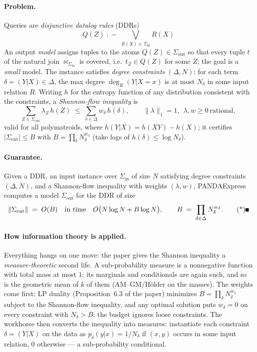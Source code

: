 \paragraph{Problem.}
Queries are \emph{disjunctive datalog rules} (DDRs)
\[
Q(Z) \;:\!-\; \bigvee_{R(X) \in \Sigma_{\mathrm{in}}} R(X)
\]
An output \emph{model} assigns tuples to the atoms
$Q(Z) \in \Sigma_{\mathrm{out}}$ so that every tuple $t$ of the natural join
$\Join_{\Sigma_{\mathrm{in}}}$ is covered, i.e.\ $t_Z \in Q(Z)$ for some $Z$; the goal
is a \emph{small} model. The instance satisfies \emph{degree constraints}
$(\Delta, N)$: for each term $\delta = (Y|X) \in \Delta$, the max degree
$\deg_R(Y|X{=}x)$ is at most $N_\delta$ in some input relation $R$. Writing $h$ for
the entropy function of any distribution consistent with the constraints, a
\emph{Shannon-flow inequality} is
\[
\sum_{Z \in \Sigma_{\mathrm{out}}} \lambda_Z\, h(Z) \;\le\;
\sum_{\delta \in \Delta} w_\delta\, h(\delta),
\qquad \| \lambda \|_1 = 1, \ \ \lambda, w \ge 0 \ \text{rational},
\]
valid for all polymatroids, where $h(Y|X) = h(XY) - h(X)$; it certifies
$|\Sigma_{\mathrm{out}}| \le B$ with $B = \prod_\delta N_\delta^{w_\delta}$ (take
logs of $h(\delta) \le \log N_\delta$).

\paragraph{Guarantee.}

\begin{theorem}\label{thm:inf-panda-main}
Given a DDR, an input instance over $\Sigma_{\mathrm{in}}$ of size $N$ satisfying
degree constraints $(\Delta, N)$, and a Shannon-flow inequality with weights
$(\lambda, w)$, PANDAExpress computes a model $\Sigma_{\mathrm{out}}$ for the DDR of
size
\[
\|\Sigma_{\mathrm{out}}\| \;=\; O(B)
\quad\text{in time}\quad
O\bigl(N\log N + B\log N\bigr),
\qquad B \;=\; \prod_{\delta\in\Delta} N_\delta^{w_\delta}. \eopm
\]
\end{theorem}

\paragraph{How information theory is applied.}
Everything hangs on one move: the paper gives the Shannon inequality a
\emph{measure-theoretic} second life. A sub-probability measure is a nonnegative
function with total mass at most $1$; its marginals and conditionals are again such,
and so is the geometric mean of $k$ of them (AM--GM/H\"older on the masses). The
weights come first: LP duality (Proposition~6.3 of the paper) minimizes
$B = \prod_\delta N_\delta^{w_\delta}$ subject to the Shannon-flow inequality, and any
optimal solution puts $w_\delta = 0$ on every constraint with $N_\delta > B$: the
budget ignores loose constraints. The workhorse then converts the inequality into
measures: instantiate each constraint $\delta = (Y|X)$ on the data as
$p_\delta(y|x) = 1/N_\delta$ if $(x,y)$ occurs in some input relation, $0$ otherwise
--- a sub-probability conditional.

